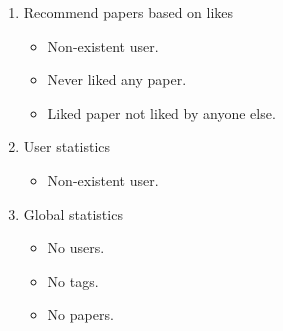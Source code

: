 \documentclass{article}
\begin{document}
\begin{enumerate}[start=3]
\begin{enumerate}
        \item Recommend papers based on likes
        \begin{itemize}
            \item Non-existent user.
            \item Never liked any paper.
            \item Liked paper not liked by anyone else.
        \end{itemize}

        \item User statistics
        \begin{itemize}
            \item Non-existent user.
        \end{itemize}

        \item Global statistics
        \begin{itemize}
            \item No users.
            \item No tags.
            \item No papers.
        \end{itemize}
    \end{enumerate}
\end{enumerate}
\end{document}
